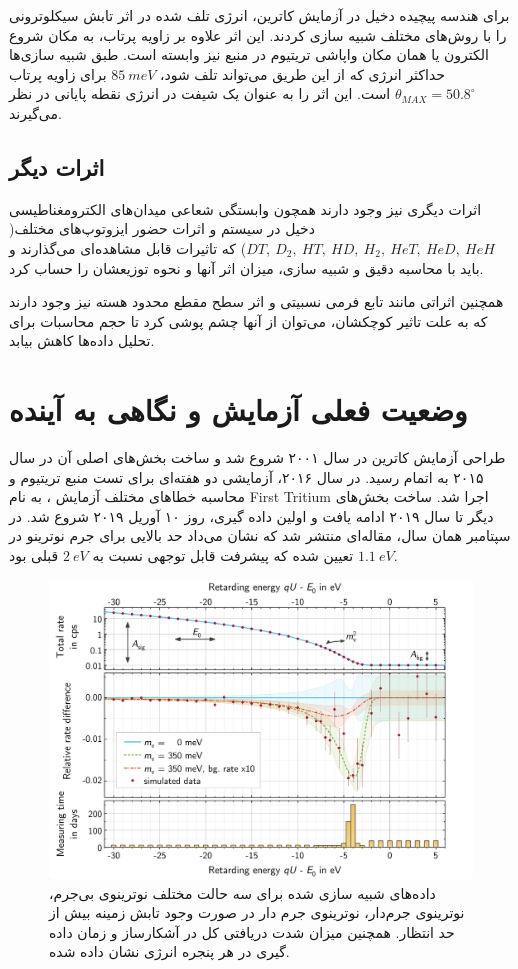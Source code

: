 \documentclass[a4paper,11pt,oneside,openany]{iut-thesis}
\begin{document}
برای هندسه پیچیده دخیل در آزمایش کاترین، انرژی تلف شده در اثر تابش سیکلوترونی را با روش‌های مختلف شبیه سازی کردند. این اثر علاوه بر زاویه پرتاب، به مکان شروع الکترون یا همان مکان واپاشی تریتیوم در منبع نیز وابسته است. طبق شبیه سازی‌ها حداکثر انرژی که از این طریق می‌تواند تلف شود، $85~meV$ برای زاویه پرتاب
 $\theta_{MAX} = 50.8^{\circ}$ 
است. این اثر را به عنوان یک شیفت در انرژی نقطه پایانی در نظر می‌گیرند.

\subsection{
اثرات دیگر
}
اثرات دیگری نیز وجود دارند همچون وابستگی شعاعی میدان‌های الکترومغناطیسی دخیل در سیستم و اثرات حضور ایزوتوپ‌های مختلف(
$DT,~D_{2},~HT,~HD,~H_{2},~HeT,~HeD,~HeH$)
که تاثیرات قابل مشاهده‌ای می‌گذارند و باید با محاسبه دقیق و شبیه سازی، میزان اثر آنها و نحوه توزیعشان را حساب کرد.

همچنین اثراتی مانند تابع فرمی نسبیتی و اثر سطح مقطع محدود هسته نیز وجود دارند که به علت تاثیر کوچکشان، می‌توان از آنها چشم پوشی کرد تا حجم محاسبات برای تحلیل داده‌ها کاهش بیابد.

\section{
وضعیت فعلی آزمایش و نگاهی به آینده
}
طراحی آزمایش کاترین در سال ۲۰۰۱ شروع شد و ساخت بخش‌های اصلی آن در سال ۲۰۱۵ به اتمام رسید. در سال ۲۰۱۶، آزمایشی دو هفته‌ای برای تست منبع تریتیوم و محاسبه خطاهای مختلف آزمایش ، به نام First Tritium اجرا شد. ساخت بخش‌های دیگر تا سال ۲۰۱۹ ادامه یافت و اولین داده گیری، روز ۱۰ آوریل ۲۰۱۹ شروع شد. در سپتامبر همان سال، مقاله‌ای منتشر شد که نشان می‌داد حد بالایی برای جرم نوترینو در $1.1~eV$ تعیین شده که پیشرفت قابل توجهی نسبت به $2~eV$ قبلی بود.

\begin{figure}
	\includegraphics[width=\linewidth]{sim}
	\caption{
		داده‌های شبیه سازی شده برای سه حالت مختلف نوترینوی بی‌جرم، نوترینوی جرم‌دار، نوترینوی جرم دار در صورت وجود تابش زمینه بیش از حد انتظار. همچنین میزان شدت دریافتی کل در آشکارساز و زمان داده گیری در هر پنجره انرژی نشان داده شده.	
}
	\label{sim}
\end{figure}
\end{document}
